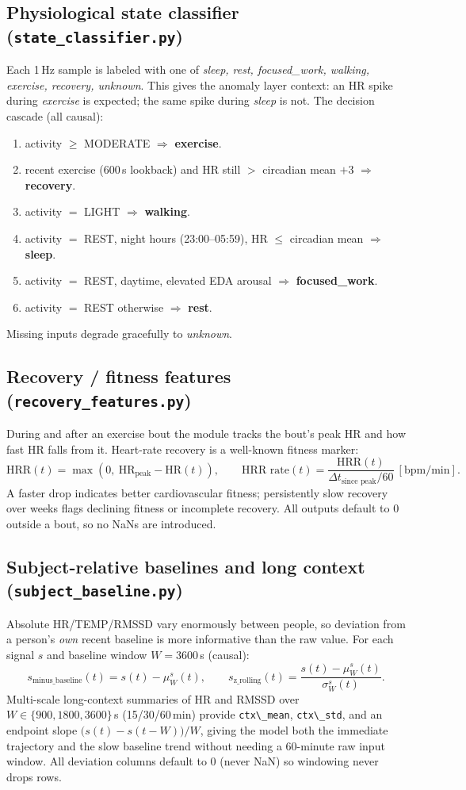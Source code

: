 \documentclass[11pt,a4paper]{article}
\newcommand{\code}[1]{\lstinline[basicstyle=\ttfamily\normalsize]!#1!}
\begin{document}
\subsection{Physiological state classifier (\texttt{state\_classifier.py})}
Each 1\,Hz sample is labeled with one of
\emph{sleep, rest, focused\_work, walking, exercise, recovery, unknown}. This
gives the anomaly layer context: an HR spike during \emph{exercise} is expected;
the same spike during \emph{sleep} is not. The decision cascade (all causal):
\begin{enumerate}[leftmargin=1.4em,itemsep=1pt]
\item activity $\geq$ MODERATE $\Rightarrow$ \textbf{exercise}.
\item recent exercise (600\,s lookback) and HR still $>$ circadian mean $+3$
      $\Rightarrow$ \textbf{recovery}.
\item activity $=$ LIGHT $\Rightarrow$ \textbf{walking}.
\item activity $=$ REST, night hours (23:00--05:59), HR $\le$ circadian mean
      $\Rightarrow$ \textbf{sleep}.
\item activity $=$ REST, daytime, elevated EDA arousal $\Rightarrow$
      \textbf{focused\_work}.
\item activity $=$ REST otherwise $\Rightarrow$ \textbf{rest}.
\end{enumerate}
Missing inputs degrade gracefully to \emph{unknown}.

\subsection{Recovery / fitness features (\texttt{recovery\_features.py})}
During and after an exercise bout the module tracks the bout's peak HR and how
fast HR falls from it. Heart-rate recovery is a well-known fitness marker:
\[
\text{HRR}(t)=\max(0,\ \text{HR}_{\text{peak}}-\text{HR}(t)),\qquad
\text{HRR rate}(t)=\frac{\text{HRR}(t)}{\Delta t_{\text{since peak}}/60}\ [\text{bpm/min}].
\]
A faster drop indicates better cardiovascular fitness; persistently slow
recovery over weeks flags declining fitness or incomplete recovery. All outputs
default to 0 outside a bout, so no NaNs are introduced.

\subsection{Subject-relative baselines and long context (\texttt{subject\_baseline.py})}
Absolute HR/TEMP/RMSSD vary enormously between people, so deviation from a
person's \emph{own} recent baseline is more informative than the raw value. For
each signal $s$ and baseline window $W=3600$\,s (causal):
\[
s_{\text{minus\_baseline}}(t)=s(t)-\mu^s_W(t),\qquad
s_{\text{z\_rolling}}(t)=\frac{s(t)-\mu^s_W(t)}{\sigma^s_W(t)}.
\]
Multi-scale long-context summaries of HR and RMSSD over $W\in\{900,1800,3600\}$\,s
(15/30/60\,min) provide \code{ctx\_mean}, \code{ctx\_std}, and an endpoint slope
$\big(s(t)-s(t-W)\big)/W$, giving the model both the immediate trajectory and the
slow baseline trend without needing a 60-minute raw input window. All deviation
columns default to 0 (never NaN) so windowing never drops rows.
\end{document}
